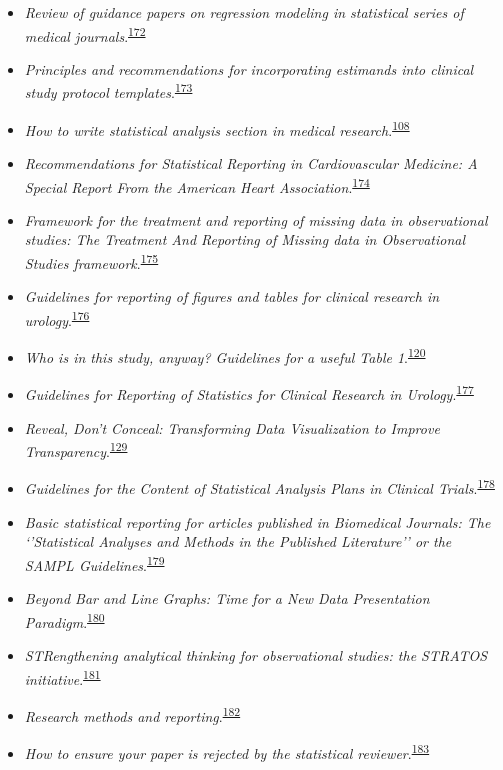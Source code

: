 \documentclass[
]{book}
\begin{document}
\begin{itemize}
\item
  \emph{Review of guidance papers on regression modeling in statistical series of medical journals}.\textsuperscript{\protect\hyperlink{ref-Wallisch2022}{172}}
\item
  \emph{Principles and recommendations for incorporating estimands into clinical study protocol templates}.\textsuperscript{\protect\hyperlink{ref-Lynggaard2022}{173}}
\item
  \emph{How to write statistical analysis section in medical research}.\textsuperscript{\protect\hyperlink{ref-Dwivedi2022}{108}}
\item
  \emph{Recommendations for Statistical Reporting in Cardiovascular Medicine: A Special Report From the American Heart Association}.\textsuperscript{\protect\hyperlink{ref-Althouse2021}{174}}
\item
  \emph{Framework for the treatment and reporting of missing data in observational studies: The Treatment And Reporting of Missing data in Observational Studies framework}.\textsuperscript{\protect\hyperlink{ref-Lee2021}{175}}
\item
  \emph{Guidelines for reporting of figures and tables for clinical research in urology}.\textsuperscript{\protect\hyperlink{ref-Vickers2020}{176}}
\item
  \emph{Who is in this study, anyway? Guidelines for a useful Table 1}.\textsuperscript{\protect\hyperlink{ref-Hayes-Larson2019}{120}}
\item
  \emph{Guidelines for Reporting of Statistics for Clinical Research in Urology}.\textsuperscript{\protect\hyperlink{ref-assel2019}{177}}
\item
  \emph{Reveal, Don't Conceal: Transforming Data Visualization to Improve Transparency}.\textsuperscript{\protect\hyperlink{ref-Weissgerber2019}{129}}
\item
  \emph{Guidelines for the Content of Statistical Analysis Plans in Clinical Trials}.\textsuperscript{\protect\hyperlink{ref-Gamble2017}{178}}
\item
  \emph{Basic statistical reporting for articles published in Biomedical Journals: The `'Statistical Analyses and Methods in the Published Literature'' or the SAMPL Guidelines}.\textsuperscript{\protect\hyperlink{ref-Lang2015}{179}}
\item
  \emph{Beyond Bar and Line Graphs: Time for a New Data Presentation Paradigm}.\textsuperscript{\protect\hyperlink{ref-Weissgerber2015}{180}}
\item
  \emph{STRengthening analytical thinking for observational studies: the STRATOS initiative}.\textsuperscript{\protect\hyperlink{ref-Sauerbrei2014}{181}}
\item
  \emph{Research methods and reporting}.\textsuperscript{\protect\hyperlink{ref-groves2008}{182}}
\item
  \emph{How to ensure your paper is rejected by the statistical reviewer}.\textsuperscript{\protect\hyperlink{ref-stratton2005}{183}}
\end{itemize}
\end{document}
